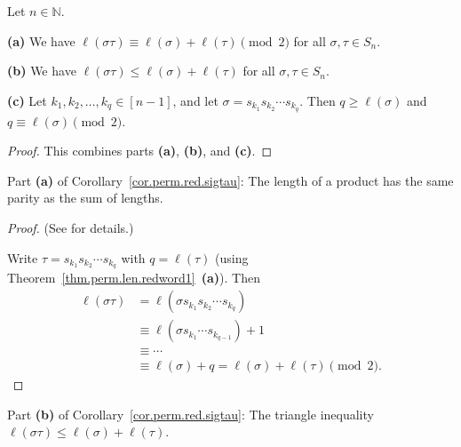 \begin{corollary}
\label{cor.perm.red.sigtau}
\leantarget
\leanok
Let $n \in \mathbb{N}$.
\medskip

\textbf{(a)} We have $\ell(\sigma\tau) \equiv \ell(\sigma) + \ell(\tau) \pmod{2}$
for all $\sigma, \tau \in S_n$.
\medskip

\textbf{(b)} We have $\ell(\sigma\tau) \leq \ell(\sigma) + \ell(\tau)$
for all $\sigma, \tau \in S_n$.
\medskip

\textbf{(c)} Let $k_1, k_2, \ldots, k_q \in [n-1]$, and let
$\sigma = s_{k_1} s_{k_2} \cdots s_{k_q}$. Then $q \geq \ell(\sigma)$
and $q \equiv \ell(\sigma) \pmod{2}$.
\end{corollary}

\begin{proof}
This combines parts \textbf{(a)}, \textbf{(b)}, and \textbf{(c)}.
\end{proof}

\begin{theorem}
\label{cor.perm.red.sigtau.a}
\leanhelper
\leanok
Part \textbf{(a)} of Corollary~\ref{cor.perm.red.sigtau}: The length of a product
has the same parity as the sum of lengths.
\end{theorem}

\begin{proof}
\leanok
(See \cite[Exercise 5.2 \textbf{(b)}]{detnotes} for details.)

Write $\tau = s_{k_1} s_{k_2} \cdots s_{k_q}$ with $q = \ell(\tau)$
(using Theorem~\ref{thm.perm.len.redword1}~\textbf{(a)}). Then
\begin{align*}
\ell(\sigma\tau) &= \ell(\sigma s_{k_1} s_{k_2} \cdots s_{k_q}) \\
&\equiv \ell(\sigma s_{k_1} \cdots s_{k_{q-1}}) + 1 \\
&\equiv \cdots \\
&\equiv \ell(\sigma) + q = \ell(\sigma) + \ell(\tau) \pmod{2}.
\end{align*}
\end{proof}

\begin{theorem}
\label{cor.perm.red.sigtau.b}
\leanhelper
\leanok
Part \textbf{(b)} of Corollary~\ref{cor.perm.red.sigtau}: The triangle inequality
$\ell(\sigma\tau) \leq \ell(\sigma) + \ell(\tau)$.
\end{theorem}

